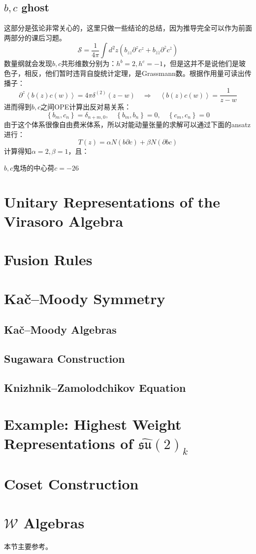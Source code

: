 \subsection{$b,c$ ghost}
这部分是弦论非常关心的，这里只做一些结论的总结，因为推导完全可以作为前面两部分的课后习题。
\begin{equation}
	\mathcal{S}=\frac1{4\pi}\int d^2z\left(b_{zz}\partial^zc^z+b_{\bar z\bar 
		z}\partial^{\overline{z}}c^{\overline{z}}\right)
\end{equation}
数量纲就会发现$b,c$共形维数分别为：$h^b=2,h^c=-1$，但是这并不是说他们是玻色子，相反，他们暂时违背自旋统计定理，是Grassmann数。根据作用量可读出传播子：
\begin{equation}
	\partial^z\left\langle b(z)c(w)\right\rangle=4\pi\left.\delta^{(2)}(z-w)\quad\Rightarrow\quad\left\langle b(z)c(w)\right\rangle=\frac1{z-w}\right. 
\end{equation}
进而得到$b,c$之间OPE计算出反对易关系：
\begin{equation}
	\left\{b_m,c_n\right\}=\delta_{n+m,0},\quad\left\{b_m,b_n\right\}=0,\quad\left\{c_m,c_n\right\}=0
\end{equation}
由于这个体系很像自由费米体系，所以对能动量张量的求解可以通过下面的ansatz进行：
\begin{equation}
	T(z)=\alpha N\left(b\partial c\right)+\beta N\left(\partial bc\right)
\end{equation}
计算得知$\alpha=2,\beta=1$，且：
\begin{theorem}
	$b,c$鬼场的中心荷$\boxed{c=-26}$
\end{theorem}
\section{Unitary Representations of the Virasoro Algebra}
\section{Fusion Rules}
\section{Ka\v{c}\mbox{–}Moody Symmetry}
\subsection{Ka\v{c}\mbox{–}Moody Algebras}
\subsection{Sugawara Construction}
\subsection{Knizhnik\mbox{–}Zamolodchikov Equation}
\section{Example: Highest Weight Representations of $\widehat{\mathfrak{su}}(2)_{k}$ }
\section{Coset Construction}
\section{$\mathcal{W}$ Algebras}
本节主要参考\cite{Pope:1991ig}。
